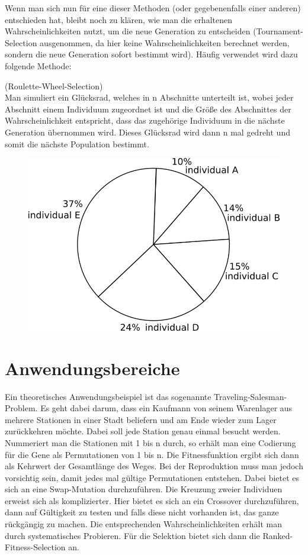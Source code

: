 Wenn man sich nun für eine dieser Methoden (oder gegebenenfalls einer anderen) entschieden hat, bleibt noch zu klären, wie man die erhaltenen Wahrscheinlichkeiten nutzt, um die neue Generation zu entscheiden (Tournament-Selection ausgenommen, da hier keine Wahrscheinlichkeiten berechnet werden, sondern die neue Generation sofort bestimmt wird). Häufig verwendet wird dazu folgende Methode:
\begin{algo}(Roulette-Wheel-Selection)\\
	Man simuliert ein Glücksrad, welches in n Abschnitte unterteilt ist, wobei jeder Abschnitt einem Individuum zugeordnet ist und die Größe des Abschnittes der Wahrscheinlichkeit entspricht, dass das zugehörige Individuum in die nächste Generation übernommen wird. Dieses Glücksrad wird dann n mal gedreht und somit die nächste Population bestimmt.
	\begin{figure}[h]
		\includegraphics[width=0.7\linewidth]{chapters/genetic/rouletteWheel.png}
	\end{figure}
	
\end{algo}
\section{Anwendungsbereiche}
Ein theoretisches Anwendungsbeispiel ist das sogenannte Traveling-Salesman-Problem. Es geht dabei darum, dass ein Kaufmann von seinem Warenlager aus mehrere Stationen in einer Stadt beliefern und am Ende wieder zum Lager zurückkehren möchte. Dabei soll jede Station genau einmal besucht werden. Nummeriert man die Stationen mit 1 bis n durch, so erhält man eine Codierung für die Gene als Permutationen von 1 bis n. Die Fitnessfunktion ergibt sich dann als Kehrwert der Gesamtlänge des Weges. Bei der Reproduktion muss man jedoch vorsichtig sein, damit jedes mal gültige Permutationen entstehen. Dabei bietet es sich an eine Swap-Mutation durchzuführen. Die Kreuzung zweier Individuen erweist sich als komplizierter. Hier bietet es sich an ein Crossover durchzuführen, dann auf Gültigkeit zu testen und falls diese nicht vorhanden ist, das ganze rückgängig zu machen. Die entsprechenden Wahrscheinlichkeiten erhält man durch systematisches Probieren. Für die Selektion bietet sich dann die Ranked-Fitness-Selection an.

